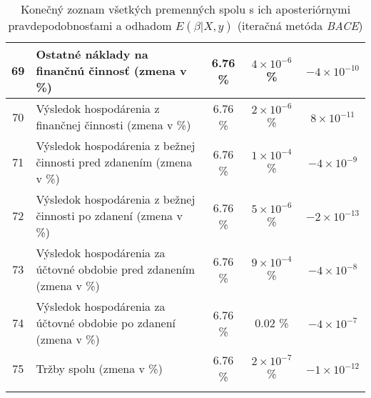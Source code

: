 \begin{longtable}{ |c|p{5cm}|c|c|c| }
        \hline
        69 & Ostatné náklady na finančnú činnosť (zmena v \%) & 6.76 \% & \(4 \times 10^{-6}\) \% & \(-4 \times 10^{-10}\) \\
        \hline
        70 & Výsledok hospodárenia z finančnej činnosti (zmena v \%) & 6.76 \% & \(2 \times 10^{-6}\) \% & \(8 \times 10^{-11}\) \\
        \hline
        71 & Výsledok hospodárenia z bežnej činnosti pred zdanením (zmena v \%) & 6.76 \% & \(1 \times 10^{-4}\) \% & \(-4 \times 10^{-9}\) \\
        \hline
        72 & Výsledok hospodárenia z bežnej činnosti po zdanení (zmena v \%) & 6.76 \% & \(5 \times 10^{-6}\) \% & \(-2 \times 10^{-13}\) \\
        \hline
        73 & Výsledok hospodárenia za účtovné obdobie pred zdanením (zmena v \%) & 6.76 \% & \(9 \times 10^{-4}\) \% & \(-4 \times 10^{-8}\) \\
        \hline
        74 & Výsledok hospodárenia za účtovné obdobie po zdanení (zmena v \%) & 6.76 \% & 0.02 \% & \(-4 \times 10^{-7}\) \\
        \hline
        75 & Tržby spolu (zmena v \%) & 6.76 \% & \(2 \times 10^{-7}\) \% & \(-1 \times 10^{-12}\) \\
        \hline
    \caption{Konečný zoznam všetkých premenných spolu s ich aposteriórnymi pravdepodobnosťami a odhadom \(E(\beta|X, y)\) (iteračná metóda \emph{BACE})}
    \label{bace2_pp}
\end{longtable}